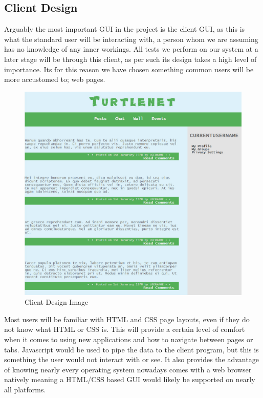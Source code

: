 \subsection{Client Design}
Arguably the most important GUI in the project is the client GUI, as this is what
the standard user will be interacting with, a person whom we are assuming has no
knowledge of any inner workings. All tests we perform on our system at a later 
stage will be through this client, as per such its design takes a high level of
importance. Its for this reason we have chosen something common users will be 
more accustomed to; web pages.

\begin{figure}[H]
    \centering
    \includegraphics[width=\textwidth]{images/design/client_interface.jpg}
    \caption{Client Design Image}
    \label{fig:client}
\end{figure}

Most users will be familiar with HTML and CSS page layouts, even if they do not
know what HTML or CSS is. This will provide a certain level of comfort when it 
comes to using new applications and how to navigate between pages or tabs.
Javascript would be used to pipe the data to the client program, but this is 
something the user would not interact with or see. It also provides the 
advantage of knowing nearly every operating system nowadays comes with a web 
browser natively meaning a HTML/CSS based GUI would likely be supported on 
nearly all platforms. 

